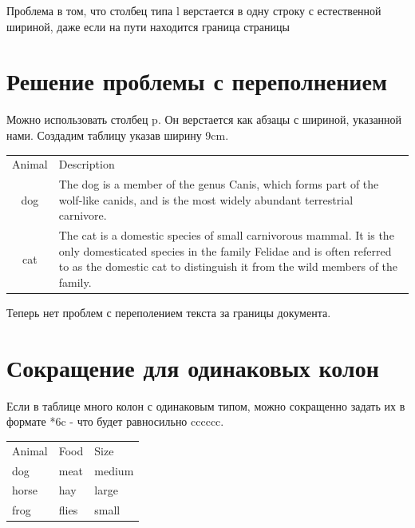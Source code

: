 \documentclass{article}
\begin{document}
  \smallskip

  Проблема в том, что столбец типа l верстается в одну строку с естественной шириной, даже если на пути находится граница страницы



  \section{Решение проблемы с переполнением}
  \label{sec:overflowfix}
  
  Можно использовать столбец p. Он верстается как абзацы с шириной, указанной нами. Создадим таблицу указав ширину 9cm.

  \smallskip

  \begin{tabular}{cp{9cm}}
    Animal & Description \\
    dog & The dog is a member of the genus Canis, which forms
     part of the
    wolf-like canids, and is the most widely abundant
     terrestrial
    carnivore. \\
    cat & The cat is a domestic species of small carnivorous
     mammal. It is the
    only domesticated species in the family Felidae and
     is often referred
    to as the domestic cat to distinguish it from the
     wild members of the
    family. \\
  \end{tabular}

  \smallskip

  Теперь нет проблем с переполением текста за границы документа.


  \section{Сокращение для одинаковых колон}
  \label{sec:short}
  
  Если в таблице много колон с одинаковым типом, можно сокращенно задать их в формате *{6}{c} - что будет равносильно cccccc.

  \smallskip

  \begin{tabular}{*{3}{l}}
    Animal & Food & Size \\
    dog & meat & medium \\
    horse & hay & large \\
    frog & flies & small \\
  \end{tabular}

  \smallskip
\end{document}
